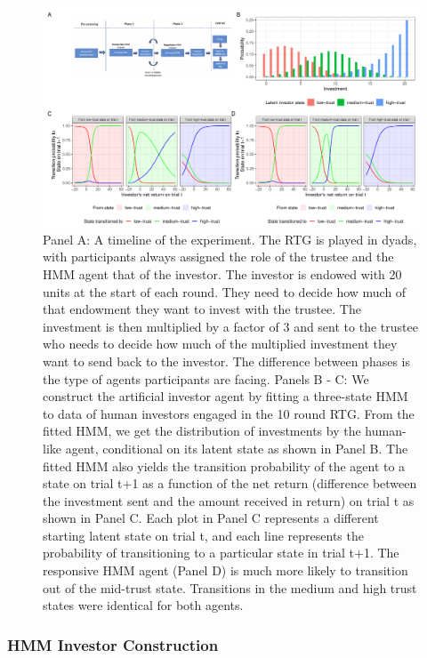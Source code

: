 \documentclass[
]{article}
\begin{document}
\begin{landscape}
\begin{figure}[htbp]
\centering
\includegraphics[width=\linewidth]{plots/figure1.pdf}
\caption{\small{Panel A: A timeline of the experiment. The RTG is played in dyads, with participants always assigned the role of the trustee and the HMM agent that of the investor. The investor is endowed with 20 units at the start of each round. They need to decide how much of that endowment they want to invest with the trustee. The investment is then multiplied by a factor of 3 and sent to the trustee who needs to decide how much of the multiplied investment they want to send back to the investor. The difference between phases is the type of agents participants are facing. Panels B - C: We construct the artificial investor agent by fitting a three-state HMM to data of human investors engaged in the 10 round RTG. From the fitted HMM, we get the distribution of investments by the human-like agent, conditional on its latent state as shown in Panel B. The fitted HMM also yields the transition probability of the agent to a state on trial t+1 as a function of the net return (difference between the investment sent and the amount received in return) on trial t as shown in Panel C. Each plot in Panel C represents a different starting latent state on trial t, and each line represents the probability of transitioning to a particular state in trial t+1.  The responsive HMM agent (Panel D) is much more likely to transition out of the mid-trust state. Transitions in the medium and high trust states were identical for both agents.}}
\label{fig:combinedPlots}
\end{figure}
\end{landscape}

\subsubsection{HMM Investor Construction}\label{hmm-investor-construction}
\end{document}
